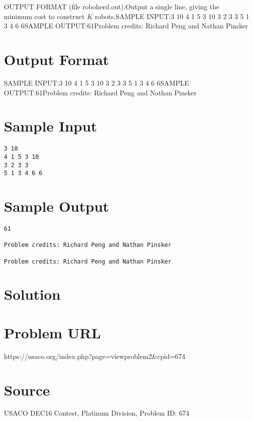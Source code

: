 \documentclass[12pt]{article}
\begin{document}
OUTPUT FORMAT (file roboherd.out):Output a single line, giving the minimum cost to construct $K$ robots.SAMPLE INPUT:3 10
4 1 5 3 10
3 2 3 3
5 1 3 4 6 6SAMPLE OUTPUT:61Problem credits: Richard Peng and Nathan Pinsker

\section*{Output Format}
SAMPLE INPUT:3 10
4 1 5 3 10
3 2 3 3
5 1 3 4 6 6SAMPLE OUTPUT:61Problem credits: Richard Peng and Nathan Pinsker

\section*{Sample Input}
\begin{verbatim}
3 10
4 1 5 3 10
3 2 3 3
5 1 3 4 6 6
\end{verbatim}

\section*{Sample Output}
\begin{verbatim}
61

Problem credits: Richard Peng and Nathan Pinsker

Problem credits: Richard Peng and Nathan Pinsker
\end{verbatim}

\section*{Solution}


\section*{Problem URL}
https://usaco.org/index.php?page=viewproblem2&cpid=674

\section*{Source}
USACO DEC16 Contest, Platinum Division, Problem ID: 674
\end{document}
